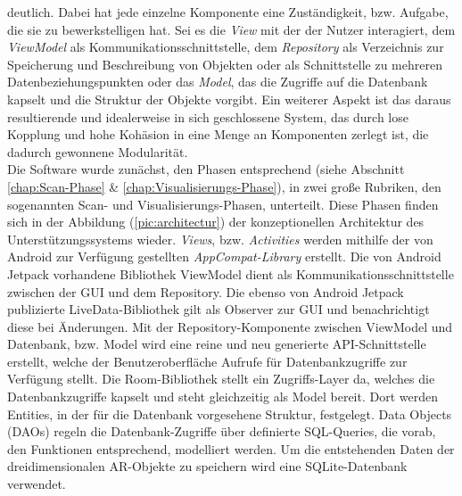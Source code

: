 deutlich. Dabei hat jede einzelne Komponente eine Zuständigkeit, bzw. Aufgabe, die sie zu bewerkstelligen hat. Sei es die \textit{View} 
mit der der Nutzer interagiert, dem \textit{ViewModel} als Kommunikationsschnittstelle, dem %
\textit{Repository} als Verzeichnis zur Speicherung und Beschreibung von Objekten oder als Schnittstelle zu mehreren Datenbeziehungspunkten 
oder das \textit{Model}, das die Zugriffe auf die Datenbank kapselt und die Struktur der Objekte vorgibt. %
Ein weiterer Aspekt ist das daraus resultierende und idealerweise in sich geschlossene System, das durch lose Kopplung und hohe Kohäsion in 
eine Menge an Komponenten zerlegt ist, die dadurch gewonnene Modularität. 
\\ 
\linebreak
Die Software wurde zunächst, den Phasen entsprechend (siehe Abschnitt \ref{chap:Scan-Phase} \& \ref{chap:Visualisierungs-Phase}), in zwei 
große Rubriken, den sogenannten Scan- und Visualisierungs-Phasen, unterteilt. Diese Phasen finden sich in der Abbildung (\ref{pic:architectur}) der 
konzeptionellen Architektur des Unterstützungssystems wieder. 
\textit{Views}, bzw. \textit{Activities} werden mithilfe der von Android zur Verfügung gestellten \textit{AppCompat-Library} erstellt. Die 
von Android Jetpack vorhandene Bibliothek ViewModel dient als Kommunikationsschnittstelle zwischen der \acs{GUI} und dem Repository. 
Die ebenso von Android Jetpack publizierte LiveData-Bibliothek gilt als Observer zur \acs{GUI} und benachrichtigt diese bei Änderungen. Mit 
der Repository-Komponente zwischen ViewModel und Datenbank, bzw. Model wird eine reine und neu generierte \acs{API}-Schnittstelle erstellt, 
welche der Benutzeroberfläche Aufrufe für Datenbankzugriffe zur Verfügung stellt. Die Room-Bibliothek stellt ein Zugriffs-Layer da, welches 
die Datenbankzugriffe kapselt und steht gleichzeitig als Model bereit. Dort werden Entities, in der für die Datenbank vorgesehene 
Struktur, festgelegt. Data Objects (DAOs) regeln die Datenbank-Zugriffe über definierte SQL-Queries, die vorab, den Funktionen entsprechend, 
modelliert werden. Um die entstehenden Daten der dreidimensionalen \acs{AR}-Objekte zu speichern wird eine SQLite-Datenbank verwendet.
